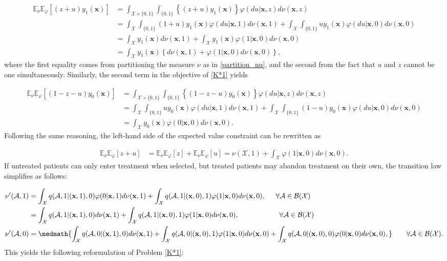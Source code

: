 \documentclass[12pt,a4paper]{article}
\newcommand{\bx}{\mathbf{x}}
\newcommand{\mA}{\mathcal{A}}
\newcommand{\mX}{\mathcal{X}}
\newcommand{\mABX}{\mathcal{A} \in \mathcal{B}(\mathcal{X})}
\begin{document}
	\begin{align}
		\mathbb{E}_{\nu}\mathbb{E}_{\varphi} [(z+u) y_1(\bx)]& = \int_{\mX \times\{0,1\}} \int_{\{0,1\}} \left\{ (z+u) y_1(\bx)   \right\} \varphi(du | \bx,z) d\nu(\bx,z) \nonumber \\
		&= \int_{\mX } \int_{\{0,1\}} (1+u) y_1(\bx) \varphi(du | \bx,1) d\nu(\bx,1)  + \int_{\mX } \int_{\{0,1\}} u y_1(\bx)  \varphi(du | \bx,0) d\nu(\bx,0) \nonumber \\
		&= \int_{\mX }  y_1(\bx)  d\nu(\bx,1)  + \int_{\mX }  y_1(\bx)  \varphi(1| \bx,0) d\nu(\bx,0) \nonumber \\
		&=  \int_{\mX }  y_1(\bx)   \left\{ d\nu(\bx,1)  +\varphi(1| \bx,0) d\nu(\bx,0)\right\},   \ \nonumber 
	\end{align}
	where the first equality comes from partitioning the measure $\nu$ as in \eqref{partition_nu}, and the second from the fact that $u$ and $z$ cannot be one simultaneously. Similarly, the second term in the objective of \eqref{K*1} yields
	
	\begin{align}
		\mathbb{E}_{\nu}\mathbb{E}_{\varphi} [(1-z-u) y_0(\bx)]& = \int_{\mX \times\{0,1\}} \int_{\{0,1\}} \left\{ (1-z-u) y_0(\bx)   \right\} \varphi(du | \bx,z) d\nu(\bx,z) \nonumber \\
		&= \int_{\mX } \int_{\{0,1\}} u y_0(\bx) \varphi(du | \bx,1) d\nu(\bx,1)  + \int_{\mX } \int_{\{0,1\}} (1-u) y_0(\bx)  \varphi(du | \bx,0) d\nu(\bx,0) \nonumber \\
		&= \int_{\mX }  y_0(\bx)  \varphi(0| \bx,0) d\nu(\bx,0). \nonumber 
	\end{align}
	Following the same reasoning, the left-hand side of the expected value constraint can be rewritten as
	
	\begin{align}
		\mathbb{E}_{\nu}\mathbb{E}_{\varphi} [z+u] &=  \mathbb{E}_{\nu}\mathbb{E}_{\varphi} [z]+ \mathbb{E}_{\nu}\mathbb{E}_{\varphi}[u] = \nu(\mX,1)+\int_{\mX} \varphi(1|\bx,0)d\nu(\bx,0). 
	\end{align}
	If untreated patients can only enter treatment when selected, but treated patients may abandon treatment on their own, the transition law simplifies as follows: 
	
	\begin{align}
		\nu'(\mA,1)&=\int_\mX  q(\mA,1 | (\bx,1),0) \varphi(0|\bx,1) d\nu(\bx,1) + \int_\mX  q(\mA,1 | (\bx,0),1) \varphi(1|\bx,0)d\nu(\bx,0), \hspace{0.5cm } \forall \mABX \nonumber \\
		&=\int_\mX  q(\mA,1 | (\bx,1),0) d\nu(\bx,1) + \int_\mX  q(\mA,1 | (\bx,0),1) \varphi(1|\bx,0)d\nu(\bx,0), \hspace{2cm}  \forall \mABX  \label{nu1}\\
		\nu'(\mA,0)&= \medmath{\int_\mX  q(\mA,0 | (\bx,1),0)  d\nu(\bx,1)+\int_\mX  q(\mA,0 | (\bx,0),1) \varphi(1|\bx,0)d\nu(\bx,0)  +\int_\mX  q(\mA,0 | (\bx,0),0) \varphi(0|\bx,0) d\nu(\bx,0),}
		\qquad \forall \mABX. \label{nu0}
	\end{align}
	This yields the following reformulation of Problem \eqref{K*1}:
	
\end{document}
